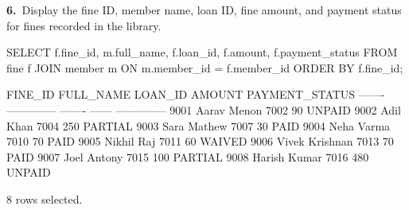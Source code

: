 \noindent\begin{minipage}{\linewidth}
\begingroup{}
{\fontsize{14}{17}\selectfont\textbf{6.}}\ Display the fine ID, member name, loan ID, fine amount, and payment status for fines recorded in the library.\par
\endgroup\vspace{12pt}


\begin{sqlcode}
SELECT f.fine_id, m.full_name, f.loan_id, f.amount, f.payment_status
FROM fine f
JOIN member m ON m.member_id = f.member_id
ORDER BY f.fine_id;
\end{sqlcode}

\vspace{18pt}


\begin{sqlout}[fontsize=\small]
FINE_ID  FULL_NAME       LOAN_ID  AMOUNT  PAYMENT_STATUS
-------  --------------  -------  ------  --------------
   9001  Aarav Menon        7002      90  UNPAID
   9002  Adil Khan          7004     250  PARTIAL
   9003  Sara Mathew        7007      30  PAID
   9004  Neha Varma         7010      70  PAID
   9005  Nikhil Raj         7011      60  WAIVED
   9006  Vivek Krishnan     7013      70  PAID
   9007  Joel Antony        7015     100  PARTIAL
   9008  Harish Kumar       7016     480  UNPAID

8 rows selected.
\end{sqlout}
\end{minipage}\par\vspace{24pt}

